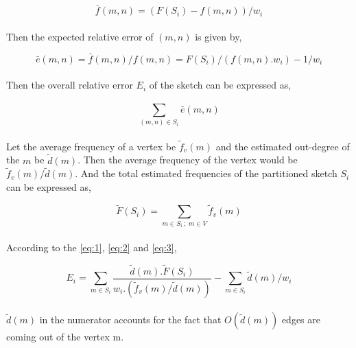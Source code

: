 \[\bar{f}(m,n) = (F(S_i) - f(m,n)) / w_i\]

\paragraph{}
Then the expected relative error of \((m,n)\) is given by,

\begin{equation}
    \bar{e}(m,n) = \bar{f}(m,n) / f(m,n) = F(S_i) / (f(m,n) . w_i) - 1 / w_i
    \label{eq:1}
\end{equation}

\paragraph{}
Then the overall relative error \(E_i\) of the sketch can be expressed as,

\begin{equation}
    \sum_{(m,n) \in S_i}^{} \bar{e}(m,n)
    \label{eq:2}
\end{equation}

\paragraph{}
Let the average frequency of a vertex be \(\tilde{f}_v(m)\) and the estimated out-degree of the \(m\) be \(\tilde{d}(m)\). Then the average frequency of the vertex would be \( \tilde{f}_v(m) / \tilde{d}(m) \). And the total estimated frequencies of the partitioned sketch \(S_i\) can be expressed as,

\begin{equation}
    \tilde{F}(S_i) = \sum_{m \in S_i \: ; \: m \in V}^{} \tilde{f}_v(m)
    \label{eq:3}
\end{equation}

\paragraph{}
According to the \autoref{eq:1}, \autoref{eq:2} and \autoref{eq:3},

\begin{equation}
    E_i = \sum_{m \in S_i}^{} \frac{\tilde{d}(m) . \tilde{F}(S_i)}{w_i . (\tilde{f}_v(m) / \tilde{d}(m))} - \sum_{m \in S_i}^{} \tilde{d}(m) / w_i
    \label{eq:4}
\end{equation}

\paragraph{}
\(\tilde{d}(m)\) in the numerator accounts for the fact that \(O(\tilde{d}(m))\) edges are coming out of the vertex m.

